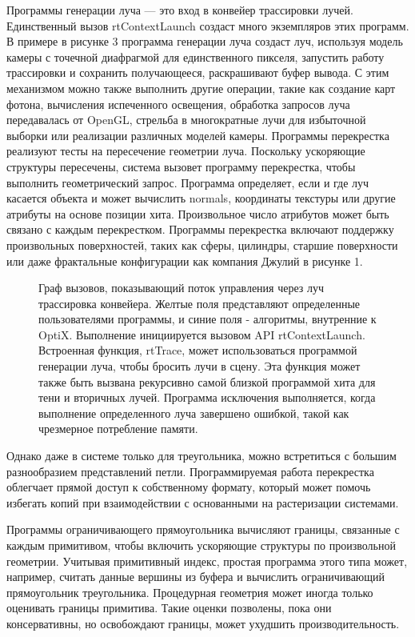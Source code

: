 Программы генерации луча --- это вход в конвейер трассировки лучей. 
Единственный вызов rtContextLaunch создаст много экземпляров этих программ. 
В примере в рисунке 3 программа генерации луча создаст луч, используя модель камеры с точечной диафрагмой для единственного пикселя, запустить работу трассировки и сохранить получающееся, раскрашивают буфер вывода. С этим механизмом можно также выполнить другие операции, такие как создание карт фотона, вычисления испеченного освещения, обработка запросов луча передавалась от OpenGL, стрельба в многократные лучи для избыточной выборки или реализации различных моделей камеры. Программы перекрестка реализуют тесты на пересечение геометрии луча. Поскольку ускоряющие структуры пересечены, система вызовет программу перекрестка, чтобы выполнить геометрический запрос. Программа определяет, если и где луч касается объекта и может вычислить normals, координаты текстуры или другие атрибуты на основе позиции хита. Произвольное число атрибутов может быть связано с каждым перекрестком. Программы перекрестка включают поддержку произвольных поверхностей, таких как сферы, цилиндры, старшие поверхности или даже фрактальные конфигурации как компания Джулий в рисунке 1.

\begin{figure}[h]
\caption{Граф вызовов, показывающий поток управления через луч
трассировка конвейера. Желтые поля представляют определенные пользователями программы, и синие поля - алгоритмы, внутренние к OptiX. Выполнение инициируется вызовом API rtContextLaunch. Встроенная функция, rtTrace, может использоваться программой генерации луча, чтобы бросить лучи в сцену. Эта функция может также быть вызвана рекурсивно
самой близкой программой хита для тени и вторичных лучей.
Программа исключения выполняется, когда выполнение определенного луча завершено ошибкой, такой как чрезмерное потребление памяти.}
\label{fig:graph-of-calling}
\end{figure}

Однако даже в системе только для треугольника, можно встретиться с большим разнообразием представлений петли.
 Программируемая работа перекрестка облегчает прямой доступ к собственному формату, который может помочь избегать копий при взаимодействии с основанными на растеризации системами.
 
   Программы ограничивающего прямоугольника вычисляют границы, связанные с каждым примитивом, чтобы включить ускоряющие структуры по произвольной геометрии. Учитывая примитивный индекс, простая программа этого типа может, например, считать данные вершины из буфера и вычислить ограничивающий прямоугольник треугольника. Процедурная геометрия может иногда только оценивать границы примитива. Такие оценки позволены, пока они консервативны, но освобождают границы, может ухудшить производительность. 

